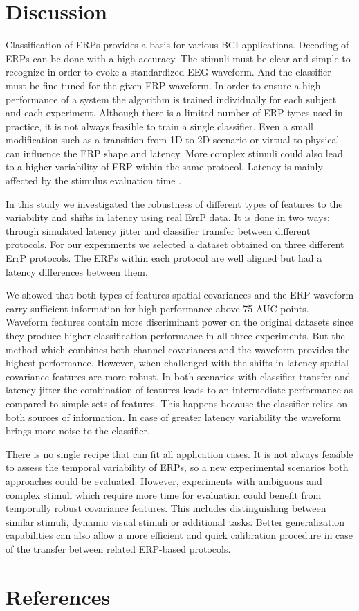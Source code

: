 \documentclass[12pt]{iopart}
\begin{document}
\section{Discussion}
\label{sec:discussion}

Classification of ERPs provides a basis for various BCI applications.
Decoding of ERPs can be done with a high accuracy.
The stimuli must be clear and simple to recognize
in order to evoke a standardized EEG waveform. And the classifier
must be fine-tuned for the given ERP waveform.
In order to ensure a high performance of a system the algorithm
is trained individually for each subject and each experiment.
Although there is a limited number of ERP types used in practice,
it is not always feasible to train a single classifier. 
Even a small
modification such as a transition from 1D to 2D scenario or virtual to physical
can influence the ERP shape and latency. More complex stimuli
could also lead to a higher variability of ERP within the same protocol.
Latency is mainly affected by the stimulus evaluation time \cite{kutas_augmenting_1977}.

In this study we investigated the robustness of different types of features
to the variability and shifts in latency using real ErrP data.
It is done in two ways: through simulated latency jitter
and classifier transfer between different protocols.
For our experiments we selected a dataset obtained on three
different ErrP protocols. The ERPs within each protocol are
well aligned but had a latency differences between them.

We showed that both types of features spatial covariances and the ERP waveform
carry sufficient information for high performance above 75 AUC points.
Waveform features contain more discriminant power on the original datasets
since they produce higher classification performance in all three experiments.
But the method which combines both channel covariances and the waveform
provides the highest performance.
However, when challenged with the shifts in latency
spatial covariance features are more robust.
In both scenarios with classifier transfer and latency jitter
the combination of features leads to an intermediate
performance as compared to simple sets of features.
This happens because the classifier relies on both
sources of information. In case of greater latency variability
the waveform brings more noise to the classifier.

There is no single recipe that can fit all application cases.
It is not always feasible to assess the temporal variability
of ERPs, so a new experimental scenarios both approaches
could be evaluated.
However, experiments with ambiguous and complex stimuli which require more time
for evaluation could benefit from temporally robust covariance features.
This includes distinguishing between similar stimuli, dynamic
visual stimuli or additional tasks.
Better generalization capabilities can also allow a more efficient and quick
calibration procedure in case of the transfer between related ERP-based protocols.


\section*{References}



\end{document}
